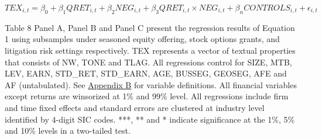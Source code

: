 %
%
%

\newpage

\setcounter{equation}{0}
\begin{equation}
	TEX_{i,t}=\beta_0+\beta_1QRET_{i,t}+\beta_2NEG_{i,t}+\beta_3QRET_{i,t}\times NEG_{i,t}+\beta_nCONTROLS_{i,t}+\epsilon_{i,t}
\end{equation}

Table 8 Panel A, Panel B and Panel C present the regression results of Equation 1 using subsamples under seasoned equity offering, stock options grants, and litigation risk settings respectively. TEX represents a vector of textual properties that consists of NW, TONE and TLAG. All regressions control for SIZE, MTB, LEV, EARN, STD\_RET, STD\_EARN, AGE, BUSSEG, GEOSEG, AFE and AF (untabulated). See \hyperref[appb]{Appendix B} for variable definitions. All financial variables except returns are winsorized at 1\% and 99\% level. All regressions include firm and time fixed effects and standard errors are clustered at industry level identified by 4-digit SIC codes. ***, ** and * indicate significance at the 1\%, 5\% and 10\% levels in a two-tailed test. 
